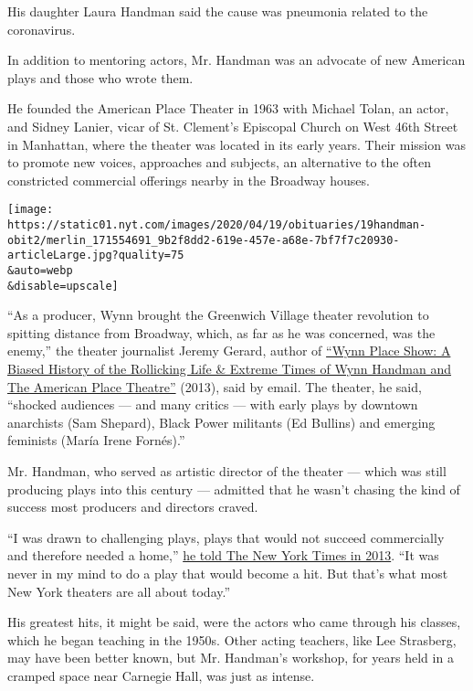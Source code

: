 His daughter Laura Handman said the cause was pneumonia related to the
coronavirus.

In addition to mentoring actors, Mr. Handman was an advocate of new
American plays and those who wrote them.

He founded the American Place Theater in 1963 with Michael Tolan, an
actor, and Sidney Lanier, vicar of St. Clement's Episcopal Church on
West 46th Street in Manhattan, where the theater was located in its
early years. Their mission was to promote new voices, approaches and
subjects, an alternative to the often constricted commercial offerings
nearby in the Broadway houses.

\texttt{[image: https://static01.nyt.com/images/2020/04/19/obituaries/19handman-obit2/merlin\_171554691\_9b2f8dd2-619e-457e-a68e-7bf7f7c20930-articleLarge.jpg?quality=75\\\&auto=webp\\\&disable=upscale]}

``As a producer, Wynn brought the Greenwich Village theater revolution
to spitting distance from Broadway, which, as far as he was concerned,
was the enemy,'' the theater journalist Jeremy Gerard, author of
\href{https://www.americantheatre.org/2014/06/14/wynn-place-show-honors-the-career-of-producer-wynn-handman-2/}{``Wynn
Place Show: A Biased History of the Rollicking Life \& Extreme Times of
Wynn Handman and The American Place Theatre''} (2013), said by email.
The theater, he said, ``shocked audiences --- and many critics --- with
early plays by downtown anarchists (Sam Shepard), Black Power militants
(Ed Bullins) and emerging feminists (María Irene Fornés).''

Mr. Handman, who served as artistic director of the theater --- which
was still producing plays into this century --- admitted that he wasn't
chasing the kind of success most producers and directors craved.

``I was drawn to challenging plays, plays that would not succeed
commercially and therefore needed a home,''
\href{https://www.nytimes.com/2013/12/26/arts/former-students-and-wynn-place-show-praise-wynn-handman.html}{he
told The New York Times in 2013}. ``It was never in my mind to do a play
that would become a hit. But that's what most New York theaters are all
about today.''

His greatest hits, it might be said, were the actors who came through
his classes, which he began teaching in the 1950s. Other acting
teachers, like Lee Strasberg, may have been better known, but Mr.
Handman's workshop, for years held in a cramped space near Carnegie
Hall, was just as intense.

